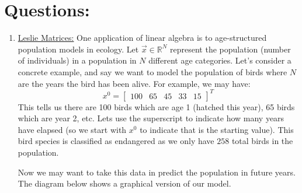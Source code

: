\documentclass[11pt, a4paper]{article}
\begin{document}
\section*{Questions:}
\begin{enumerate}
\item \underline{Leslie Matrices:} 
One application of linear algebra is to age-structured population models in ecology. Let $\vec{x} \in \mathbb{R}^N $ represent the population (number of individuals) in a population in $N$ different age categories. 
Let's consider a concrete example, and say we want to model the population of birds where $N$ are the years the bird has been alive. For example, we may have:
\begin{equation}
x^0=
\begin{bmatrix}
100 &
65 &
45 &
33 &
15
\end{bmatrix}^T
\end{equation}
This tells us there are 100 birds which are age 1 (hatched this year), 65 birds which are year 2, etc. Lets use the superscript to indicate how many years have elapsed (so we start with $x^0$ to indicate that is the starting value). This bird species is classified as endangered as we only have $258$ total birds in the population. 

Now we may want to take this data in predict the population in future years. The diagram below shows a graphical version of our model. 
\begin{center}
\end{center}






\end{enumerate}
\end{document}
